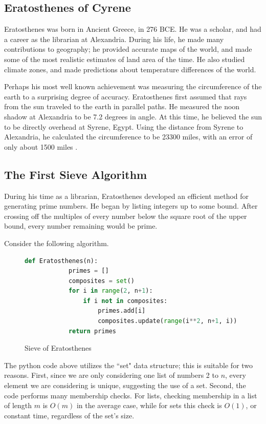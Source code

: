 \documentclass{amsart}
\theoremstyle{definition}
\theoremstyle{case}
\begin{document}
	\subsection{Eratosthenes of Cyrene}	
	Eratosthenes was born in Ancient Greece, in 276 BCE. He was a scholar, and had a career as the librarian at Alexandria. During his life, he made many contributions to geography; he provided accurate maps of the world, and made some of the most realistic estimates of land area of the time. He also studied climate zones, and made predictions about temperature differences of the world. 
	
	Perhaps his most well known achievement was measuring the circumference of the earth to a surprising degree of accuracy. Eratosthenes first assumed that rays from the sun traveled to the earth in parallel paths. He measured the noon shadow at Alexandria to be 7.2 degrees in angle. At this time, he believed the sun to be directly overhead at Syrene, Egypt. Using the distance from Syrene to Alexandria, he calculated the circumference to be 23300 miles, with an error of only about 1500 miles \cite{lawson2004}. 
	
	\subsection{The First Sieve Algorithm}
	
	During his time as a librarian, Eratosthenes developed an efficient method for generating prime numbers. He began by listing integers up to some bound. After crossing off the multiples of every number below the square root of the upper bound, every number remaining would be prime.
	
	Consider the following algorithm.
	
	\begin{figure}[H]\caption{Sieve of Eratosthenes}
		\begin{lstlisting}[language=Python]
		def Eratosthenes(n):
		    primes = []
		    composites = set()
		    for i in range(2, n+1):
		        if i not in composites:
		            primes.add[i]
		            composites.update(range(i**2, n+1, i))
		    return primes
		\end{lstlisting}
	\end{figure}
	
	The python code above utilizes the ``set" data structure; this is suitable for two reasons. First, since we are only considering one list of numbers 2 to $n$, every element we are considering is unique, suggesting the use of a set. Second, the code performs many membership checks. For lists, checking membership in a list of length $m$ is $O(m)$ in the average case, while for sets this check is $O(1)$, or constant time, regardless of the set's size.
	
\end{document}
